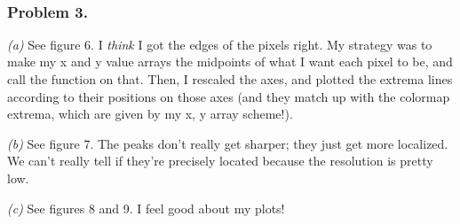 \documentclass[11pt]{article}
\begin{document}
    \begin{center}
    \end{center}
    { \hspace*{\fill} \\}
    
    \subsubsection{Problem 3.}\label{problem-3.}

\emph{(a)} See figure 6. I \emph{think} I got the edges of the pixels
right. My strategy was to make my x and y value arrays the midpoints of
what I want each pixel to be, and call the function on that. Then, I
rescaled the axes, and plotted the extrema lines according to their
positions on those axes (and they match up with the colormap extrema,
which are given by my x, y array scheme!).

\emph{(b)} See figure 7. The peaks don't really get sharper; they just
get more localized. We can't really tell if they're precisely located
because the resolution is pretty low.

\emph{(c)} See figures 8 and 9. I feel good about my plots!

    \begin{center}
    \end{center}
    { \hspace*{\fill} \\}
    
    \begin{center}
    \end{center}
    { \hspace*{\fill} \\}
    
    \begin{center}
    \end{center}
    { \hspace*{\fill} \\}
    
    \begin{center}
    \end{center}
    { \hspace*{\fill} \\}
    
\end{document}
